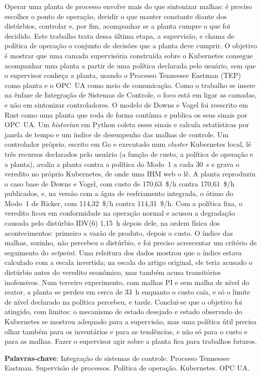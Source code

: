 \begin{resumo}[RESUMO]
\vspace*{-6mm}

Operar uma planta de processo envolve mais do que sintonizar malhas: é preciso escolher o ponto de operação, decidir o que manter constante diante dos distúrbios, controlar e, por fim, acompanhar se a planta cumpre o que foi decidido. Este trabalho trata dessa última etapa, a supervisão, e chama de política de operação o conjunto de decisões que a planta deve cumprir. O objetivo é mostrar que uma camada supervisória construída sobre o Kubernetes consegue acompanhar uma planta a partir de uma política declarada pelo usuário, sem que o supervisor conheça a planta, usando o Processo Tennessee Eastman (TEP) como planta e o OPC~UA como meio de comunicação. Como o trabalho se insere na ênfase de Integração de Sistemas de Controle, o foco está em ligar as camadas, e não em sintonizar controladores. O modelo de Downs e Vogel foi reescrito em Rust como uma planta que roda de forma contínua e publica os seus sinais por OPC~UA. Um \textit{historian} em Python coleta esses sinais e calcula estatísticas por janela de tempo e um índice de desempenho das malhas de controle. Um controlador próprio, escrito em Go e executado num \textit{cluster} Kubernetes local, lê três recursos declarados pelo usuário (a função de custo, a política de operação e a planta), avalia a planta contra a política do Modo~1 a cada 30~s e grava o veredito no próprio Kubernetes, de onde uma IHM web o lê. A planta reproduziu o caso base de Downs e Vogel, com custo de 170,63~\$/h contra 170,61~\$/h publicados, e, na versão com a água de resfriamento integrada, o ótimo do Modo~1 de Ricker, com 114,32~\$/h contra 114,31~\$/h. Com a política fixa, o veredito ficou em conformidade na operação normal e acusou a degradação causada pelo distúrbio IDV(6) 1,15~h depois dele, na ordem física dos acontecimentos: primeiro a vazão de produto, depois o custo. O índice das malhas, sozinho, não percebeu o distúrbio, e foi preciso acrescentar um critério de seguimento do \textit{setpoint}. Uma releitura dos dados mostrou que o índice estava calculado com a escala invertida; na escala do artigo original, ele teria acusado o distúrbio antes do veredito econômico, mas também acusa transitórios inofensivos. Num terceiro experimento, com malhas PI e sem malha de nível do reator, a planta se perdeu em cerca de 33~h enquanto o custo caía, e só o limite de nível declarado na política percebeu, e tarde. Conclui-se que o objetivo foi atingido, com limites: o mecanismo de estado desejado e estado observado do Kubernetes se mostrou adequado para a supervisão, mas uma política útil precisa olhar também para os inventários e para as tendências, e não só para o custo e para as malhas. Fazer o supervisor agir sobre a planta fica para trabalhos futuros.

\textbf{Palavras-chave}: Integração de sistemas de controle. Processo Tennessee Eastman. Supervisão de processos. Política de operação. Kubernetes. OPC UA.
\end{resumo}
